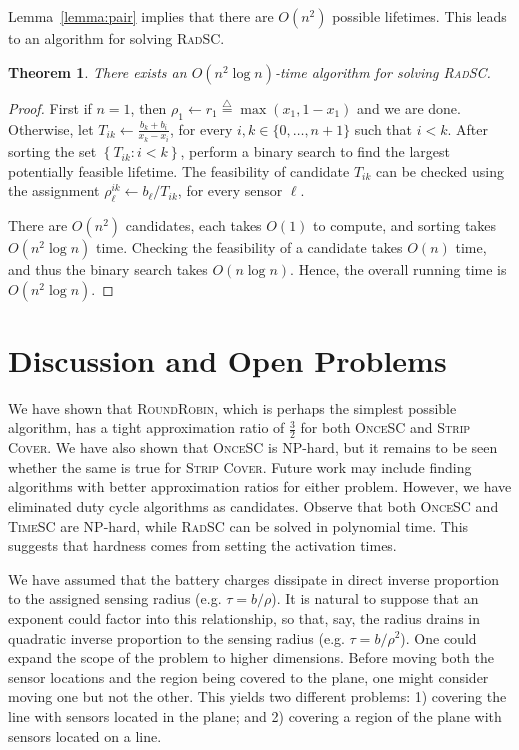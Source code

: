 \documentclass[11pt]{article}
\newtheorem{theorem}{Theorem}
\newcommand{\eqdf}{\stackrel{\scriptscriptstyle \triangle}{=}}
\newcommand{\set}[1]{\left\{ #1 \right\}}
\newcommand{\threehalves}{\frac{3}{2}}
\newcommand{\strip}{\textsc{Strip Cover}\xspace}
\newcommand{\sosc}{\textsc{OnceSC}\xspace}
\newcommand{\srsc}{\textsc{RadSC}\xspace}
\newcommand{\stsc}{\textsc{TimeSC}\xspace}
\newcommand{\rr}{\textsc{RoundRobin}\xspace}
\begin{document}
Lemma~\ref{lemma:pair} implies that there are $O(n^2)$ possible
lifetimes.  This leads to an algorithm for solving \srsc.

\begin{theorem}
\label{thm:srsc}
There exists an $O(n^2 \log n)$-time algorithm for solving \srsc.
\end{theorem}
\begin{proof}First if $n = 1$, then $\rho_1 \gets r_1 \eqdf \max(x_1,1-x_1)$ and we
are done.
Otherwise, let $T_{ik} \gets \frac{b_k + b_i}{x_k-x_i}$, for every $i, k
\in \{0,\ldots,n+1\}$ such that $i<k$.  After sorting the set
$\set{T_{ik} : i<k}$, perform a binary search to find the largest
potentially feasible lifetime.  The feasibility of candidate $T_{ik}$
can be checked using the assignment $\rho^{ik}_\ell \gets
b_\ell/T_{ik}$, for every sensor $\ell$.

There are $O(n^2)$ candidates, each takes $O(1)$ to compute, and
sorting takes $O(n^2 \log n)$ time.  Checking the feasibility of a
candidate takes $O(n)$ time, and thus the binary search takes $O(n
\log n)$.  Hence, the overall running time is $O(n^2 \log n)$.
\end{proof}



\section{Discussion and Open Problems}

We have shown that \rr, which is perhaps the simplest possible
algorithm, has a tight approximation ratio of $\threehalves$ for both
\sosc and \strip.  We have also shown that \sosc is NP-hard, but it
remains to be seen whether the same is true for \strip.  Future work
may include finding algorithms with better approximation ratios for
either problem. However, we have eliminated duty cycle algorithms as
candidates.
Observe that both \sosc and \stsc are NP-hard, while \srsc can be
solved in polynomial time.  This suggests that hardness comes from
setting the activation times.

We have assumed that the battery charges dissipate in direct
inverse proportion to the assigned sensing radius (e.g. $\tau =
b/\rho$). It is natural to suppose that an exponent could factor into
this relationship, so that, say, the radius drains in quadratic
inverse proportion to the sensing radius (e.g. $\tau = b/\rho^2$).
One could expand the scope of the problem to higher
dimensions. Before moving both the sensor locations and the
region being covered to the plane, one might consider moving one but
not the other. This yields two different problems: 1) covering the
line with sensors located in the plane; and 2) covering a region of
the plane with sensors located on a line.











\end{document}
